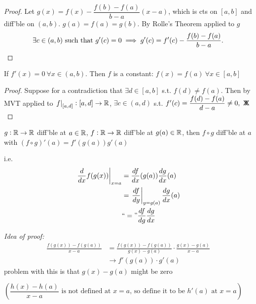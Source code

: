 \documentclass[10pt,twoside]{scrartcl}
\newcommand*{\cont}{%
  \mathsf{X}\mkern-8.5mu\mathsf{X}%
}
\begin{document}
\begin{proof}
Let $g(x) = f(x) - \dfrac{f(b) - f(a)}{b-a}(x-a)$, which is cts on $[a,b]$ and diff'ble on $(a,b)$. $g(a) = f(a) = g(b)$. By Rolle's Theorem applied to $g$
\[\exists c \in (a,b)\text{ such that }g'(c) = 0 \implies g'(c) = f'(c) - \dfrac{f(b) - f(a)}{b-a}.\qedhere\]	
\end{proof}\vspace*{5pt}

\begin{corollary}
If $f'(x) = 0~\forall x \in (a,b)$. Then $f$ is a constant: $f(x) = f(a)~\forall x \in [a,b]$
\end{corollary}
\begin{proof}
Suppose for a contradiction that $\exists d \in[a,b]$ s.t. $f(d) \neq f(a)$. Then by MVT applied to $\left. f\right|_{[a,d]}: [a,d] \to \mathbb{R}$, $\exists c\in(a,d)$ s.t. $f'(c) = \dfrac{f(d) - f(a)}{d-a} \neq 0,~\cont$	
\end{proof}


\begin{theorem} $g: \mathbb{R} \to \mathbb{R}$ diff'ble at $a \in \mathbb{R}$, $f: \mathbb{R} \to \mathbb{R}$ diff'ble at $g(a) \in \mathbb{R}$, then $f \circ g$ diff'ble at $a$ with $(f\circ g)'(a) =f'(g(a))g'(a)$
\end{theorem}

i.e. \begin{align*}\left.\frac{d}{dx} f(g(x))\right|_{x=a} &= \frac{df}{dx} (g(a)) \frac{dg}{dx}(a)\\
&= \left.\frac{df}{dy}\right|_{y=g(a)}\frac{dg}{dx}(a)\\
& ``=" \frac{df}{dg}\frac{dg}{dx}
\end{align*}

\emph{Idea of proof:} 
\begin{align*}\frac{f(g(x))-f(g(a))}{x-a}&= \frac{f(g(x)) - f(g(a))}{g(x) -g(a)}\cdot\frac{g(x)-g(a)}{x-a}\\ &\to f'(g(a))\cdot g'(a)
\end{align*}
problem with this is that $g(x) - g(a)$ might be zero

$\left(\dfrac{h(x) - h(a)}{x-a} \text{ is not defined at } x=a \text{, so define it to be } h'(a) \text{ at } x=a \right)$\\
\end{document}
